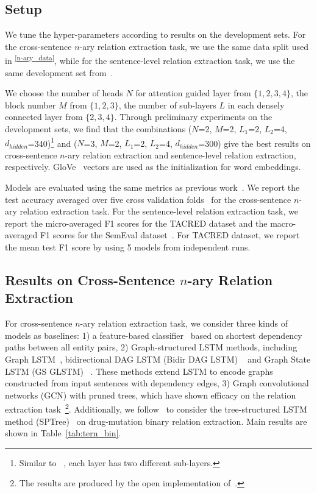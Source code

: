 \documentclass[11pt,a4paper]{article}
\begin{document}
\subsection{Setup}
We tune the hyper-parameters according to results on the development sets. For the cross-sentence $n$-ary relation extraction task, we use the same data split  used in \citep{Song2018NaryRE}\textsuperscript{\ref{n-ary_data}}, while for the sentence-level relation extraction task, we use the same development set from~\citep{Zhang2018GraphCO}.

We choose the number of heads $N$ for attention guided layer from $\{1,2,3,4\}$, the block number $M$ from $\{1,2,3\}$, the number of sub-layers $L$ in each densely connected layer from $\{2,3,4\}$. Through preliminary experiments on the development sets, we find that the combinations ($N$=2, $M$=2, $L_{1}$=2, $L_{2}$=4, $d_{hidden}$=340)\footnote{Similar to ~\citep{dcgcnforgraph2seq19guo}, each layer has two different sub-layers.} and ($N$=3, $M$=2, $L_{1}$=2, $L_{2}$=4, $d_{hidden}$=300) give the best results on cross-sentence $n$-ary relation extraction and sentence-level relation extraction, respectively. GloVe~\citep{Pennington2014GloveGV} vectors are used as the initialization for word embeddings.

Models are evaluated using the same metrics as previous work~\citep{Song2018NaryRE, Zhang2018GraphCO}. We report the test accuracy averaged over five cross validation folds~\citep{Song2018NaryRE} for the cross-sentence $n$-ary relation extraction task. For the sentence-level relation extraction task, we report the micro-averaged F1 scores for the TACRED dataset and the macro-averaged F1 scores for the SemEval dataset~\citep{Zhang2018GraphCO}. For TACRED dataset, we report the mean test F1 score by using 5 models from independent runs.

\subsection{Results on Cross-Sentence $n$-ary Relation Extraction}
For cross-sentence $n$-ary relation extraction task, we consider three kinds of models as baselines: 1) a feature-based classifier~\citep{Quirk2017DistantSF} based on shortest dependency paths between all entity pairs, 2) Graph-structured LSTM methods, including Graph LSTM~\citep{Peng2017CrossSentenceNR}, bidirectional DAG LSTM (Bidir DAG LSTM) ~\citep{Song2018NaryRE} and  Graph State LSTM (GS GLSTM) ~\citep{Song2018NaryRE}. These methods  extend LSTM to encode graphs constructed from input sentences with dependency edges,  3) Graph  convolutional  networks (GCN) with pruned trees,  which have shown efficacy on the  relation extraction task~\citep{Zhang2018GraphCO}\footnote{The results are produced by the open implementation of~\citet{Zhang2018GraphCO}.}.  Additionally, we follow~\citep{Song2018NaryRE} to consider the tree-structured LSTM method (SPTree)~\citep{Miwa2016EndtoEndRE} on drug-mutation binary relation extraction. Main results are shown in Table~\ref{tab:tern_bin}.
\end{document}

